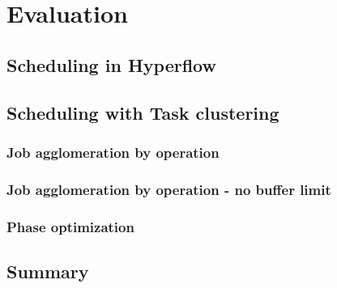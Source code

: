 \thispagestyle{only-cfoot}
\section{Evaluation}\label{s:Evaluation}



\subsection{Scheduling in Hyperflow}\label{s:Evaluation:HyperflowScheduler}




\subsection{Scheduling with Task clustering }\label{s:Evaluation:Agglomeration}




\subsubsection{Job agglomeration by operation}




\subsubsection{Job agglomeration by operation - no buffer limit}




\subsubsection{Phase optimization}




\subsection{Summary}

